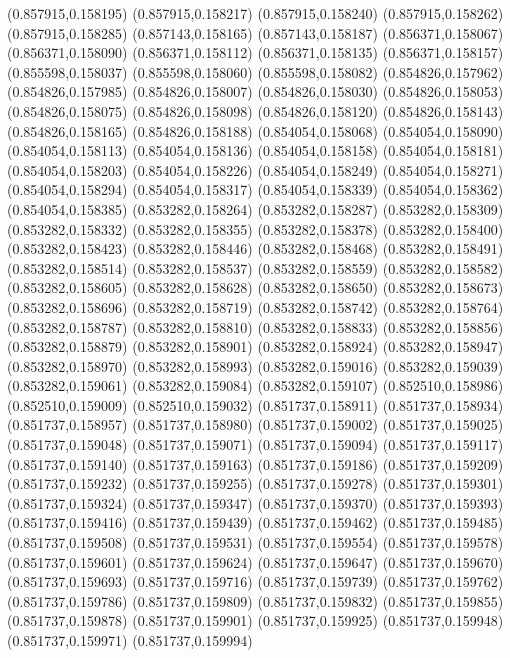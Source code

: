 (0.857915,0.158195)
(0.857915,0.158217)
(0.857915,0.158240)
(0.857915,0.158262)
(0.857915,0.158285)
(0.857143,0.158165)
(0.857143,0.158187)
(0.856371,0.158067)
(0.856371,0.158090)
(0.856371,0.158112)
(0.856371,0.158135)
(0.856371,0.158157)
(0.855598,0.158037)
(0.855598,0.158060)
(0.855598,0.158082)
(0.854826,0.157962)
(0.854826,0.157985)
(0.854826,0.158007)
(0.854826,0.158030)
(0.854826,0.158053)
(0.854826,0.158075)
(0.854826,0.158098)
(0.854826,0.158120)
(0.854826,0.158143)
(0.854826,0.158165)
(0.854826,0.158188)
(0.854054,0.158068)
(0.854054,0.158090)
(0.854054,0.158113)
(0.854054,0.158136)
(0.854054,0.158158)
(0.854054,0.158181)
(0.854054,0.158203)
(0.854054,0.158226)
(0.854054,0.158249)
(0.854054,0.158271)
(0.854054,0.158294)
(0.854054,0.158317)
(0.854054,0.158339)
(0.854054,0.158362)
(0.854054,0.158385)
(0.853282,0.158264)
(0.853282,0.158287)
(0.853282,0.158309)
(0.853282,0.158332)
(0.853282,0.158355)
(0.853282,0.158378)
(0.853282,0.158400)
(0.853282,0.158423)
(0.853282,0.158446)
(0.853282,0.158468)
(0.853282,0.158491)
(0.853282,0.158514)
(0.853282,0.158537)
(0.853282,0.158559)
(0.853282,0.158582)
(0.853282,0.158605)
(0.853282,0.158628)
(0.853282,0.158650)
(0.853282,0.158673)
(0.853282,0.158696)
(0.853282,0.158719)
(0.853282,0.158742)
(0.853282,0.158764)
(0.853282,0.158787)
(0.853282,0.158810)
(0.853282,0.158833)
(0.853282,0.158856)
(0.853282,0.158879)
(0.853282,0.158901)
(0.853282,0.158924)
(0.853282,0.158947)
(0.853282,0.158970)
(0.853282,0.158993)
(0.853282,0.159016)
(0.853282,0.159039)
(0.853282,0.159061)
(0.853282,0.159084)
(0.853282,0.159107)
(0.852510,0.158986)
(0.852510,0.159009)
(0.852510,0.159032)
(0.851737,0.158911)
(0.851737,0.158934)
(0.851737,0.158957)
(0.851737,0.158980)
(0.851737,0.159002)
(0.851737,0.159025)
(0.851737,0.159048)
(0.851737,0.159071)
(0.851737,0.159094)
(0.851737,0.159117)
(0.851737,0.159140)
(0.851737,0.159163)
(0.851737,0.159186)
(0.851737,0.159209)
(0.851737,0.159232)
(0.851737,0.159255)
(0.851737,0.159278)
(0.851737,0.159301)
(0.851737,0.159324)
(0.851737,0.159347)
(0.851737,0.159370)
(0.851737,0.159393)
(0.851737,0.159416)
(0.851737,0.159439)
(0.851737,0.159462)
(0.851737,0.159485)
(0.851737,0.159508)
(0.851737,0.159531)
(0.851737,0.159554)
(0.851737,0.159578)
(0.851737,0.159601)
(0.851737,0.159624)
(0.851737,0.159647)
(0.851737,0.159670)
(0.851737,0.159693)
(0.851737,0.159716)
(0.851737,0.159739)
(0.851737,0.159762)
(0.851737,0.159786)
(0.851737,0.159809)
(0.851737,0.159832)
(0.851737,0.159855)
(0.851737,0.159878)
(0.851737,0.159901)
(0.851737,0.159925)
(0.851737,0.159948)
(0.851737,0.159971)
(0.851737,0.159994)
